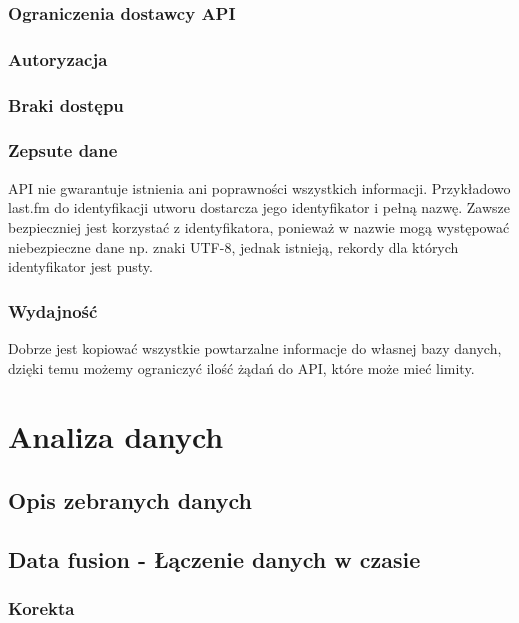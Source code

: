 \documentclass[brudnopis]{xmgr}
\begin{document}
        \subsection*{Ograniczenia dostawcy API}

        \subsection*{Autoryzacja}

        \subsection*{Braki dostępu}

        \subsection*{Zepsute dane}
        API nie gwarantuje istnienia ani poprawności wszystkich informacji.
        Przykładowo last.fm do identyfikacji utworu dostarcza jego identyfikator i pełną nazwę.
        Zawsze bezpieczniej jest korzystać z identyfikatora, ponieważ w nazwie mogą występować niebezpieczne dane np. znaki UTF-8,
        jednak istnieją, rekordy dla których identyfikator jest pusty. \cite{Goldfarb:2002:CFG}

        \subsection*{Wydajność}
        Dobrze jest kopiować wszystkie powtarzalne informacje do własnej bazy danych,
        dzięki temu możemy ograniczyć ilość żądań do API, które może mieć limity.

\chapter{Analiza danych}

    \section{Opis zebranych danych}

    \section{Data fusion - Łączenie danych w czasie}

        \subsection*{Korekta}
\end{document}
